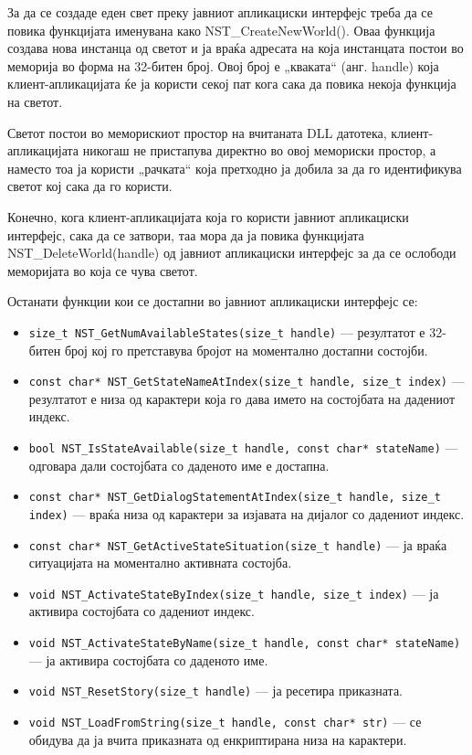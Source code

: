 За да се создаде еден свет преку јавниот апликациски интерфејс треба да се повика функцијата именувана како NST\_CreateNewWorld(). Оваа функција создава нова инстанца од светот и ја враќа адресата на која инстанцата постои во меморија во форма на 32-битен број. Овој број е „кваката“ (анг. handle) која клиент-апликацијата ќе ја користи секој пат кога сака да повика некоја функција на светот.

Светот постои во меморискиот простор на вчитаната DLL датотека, клиент-апликацијата никогаш не пристапува директно во овој мемориски простор, а наместо тоа ја користи „рачката“ која претходно ја добила за да го идентификува светот кој сака да го користи.

Конечно, кога клиент-апликацијата која го користи јавниот апликациски интерфејс, сака да се затвори, таа мора да ја повика функцијата NST\_DeleteWorld(handle) од јавниот апликациски интерфејс за да се ослободи меморијата во која се чува светот.

Останати функции кои се достапни во јавниот апликациски интерфејс се:

\begin{itemize}
\item \texttt{size\_t NST\_GetNumAvailableStates(size\_t handle)} — резултатот е 32-битен број кој го претставува бројот на моментално достапни состојби.
\item \texttt{const char* NST\_GetStateNameAtIndex(size\_t handle, size\_t index)} — резултатот е низа од карактери која го дава името на состојбата на дадениот индекс.
\item \texttt{bool NST\_IsStateAvailable(size\_t handle, const char* stateName)} — одговара дали состојбата со даденото име е достапна.
\item \texttt{const char* NST\_GetDialogStatementAtIndex(size\_t handle, size\_t index)} — враќа низа од карактери за изјавата на дијалог со дадениот индекс.
\item \texttt{const char* NST\_GetActiveStateSituation(size\_t handle)} — ја враќа ситуацијата на моментално активната состојба.
\item \texttt{void NST\_ActivateStateByIndex(size\_t handle, size\_t index)} — ја активира состојбата со дадениот индекс.
\item \texttt{void NST\_ActivateStateByName(size\_t handle, const char* stateName)} — ја активира состојбата со даденото име.
\item \texttt{void NST\_ResetStory(size\_t handle)} — ја ресетира приказната.
\item \texttt{void NST\_LoadFromString(size\_t handle, const char* str)} — се обидува да ја вчита приказната од енкриптирана низа на карактери.
\end{itemize}

